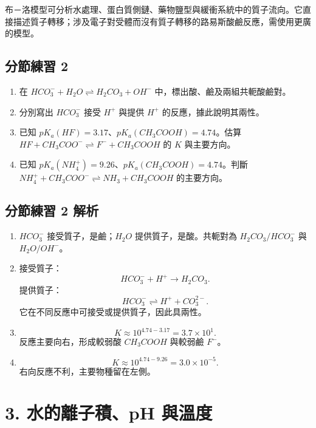 \documentclass[11pt,a4paper]{article}
\providecommand{\tightlist}{%
  \setlength{\itemsep}{0pt}\setlength{\parskip}{0pt}}
\begin{document}
布－洛模型可分析水處理、蛋白質側鏈、藥物鹽型與緩衝系統中的質子流向。它直接描述質子轉移；涉及電子對受體而沒有質子轉移的路易斯酸鹼反應，需使用更廣的模型。

\subsection{分節練習 2}\label{ux5206ux7bc0ux7df4ux7fd2-2}

\begin{enumerate}
\def\labelenumi{\arabic{enumi}.}
\tightlist
\item
  在 \(HCO_3^-+H_2O\rightleftharpoons H_2CO_3+OH^-\) 中，標出酸、鹼及兩組共軛酸鹼對。
\item
  分別寫出 \(HCO_3^-\) 接受 \(H^+\) 與提供 \(H^+\) 的反應，據此說明其兩性。
\item
  已知 \(pK_a(HF)=3.17\)、\(pK_a(CH_3COOH)=4.74\)。估算
  \(HF+CH_3COO^-\rightleftharpoons F^-+CH_3COOH\) 的 \(K\) 與主要方向。
\item
  已知 \(pK_a(NH_4^+)=9.26\)、\(pK_a(CH_3COOH)=4.74\)。判斷
  \(NH_4^++CH_3COO^-\rightleftharpoons NH_3+CH_3COOH\) 的主要方向。
\end{enumerate}

\subsection{分節練習 2 解析}\label{ux5206ux7bc0ux7df4ux7fd2-2-ux89e3ux6790}

\begin{enumerate}
\def\labelenumi{\arabic{enumi}.}
\tightlist
\item
  \(HCO_3^-\) 接受質子，是鹼；\(H_2O\) 提供質子，是酸。共軛對為 \(H_2CO_3/HCO_3^-\) 與 \(H_2O/OH^-\)。
\item
  接受質子：
  \[
  HCO_3^-+H^+\rightarrow H_2CO_3.
  \]
  提供質子：
  \[
  HCO_3^-\rightleftharpoons H^++CO_3^{2-}.
  \]
  它在不同反應中可接受或提供質子，因此具兩性。
\item
  \[
  K\approx10^{4.74-3.17}=3.7\times10^1.
  \]
  反應主要向右，形成較弱酸 \(CH_3COOH\) 與較弱鹼 \(F^-\)。
\item
  \[
   K\approx10^{4.74-9.26}=3.0\times10^{-5}.
   \]
  右向反應不利，主要物種留在左側。
\end{enumerate}

\section{3. 水的離子積、pH 與溫度}\label{ux6c34ux7684ux96e2ux5b50ux7a4dph-ux8207ux6eabux5ea6}
\end{document}

